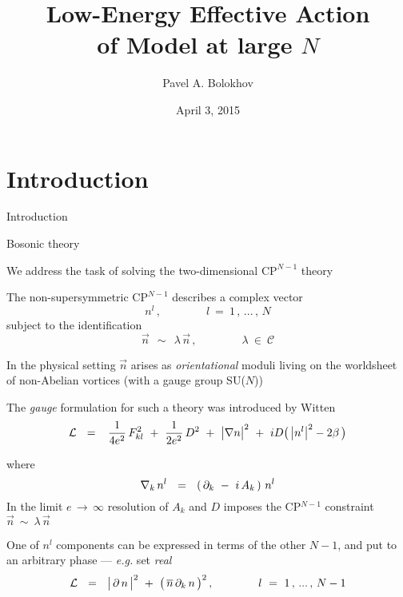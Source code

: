 \documentclass{beamer}
\title[Effective Action of \cp]
      {Low-Energy Effective Action\\
       of \cp Model at large $ N $}
\author{Pavel A. Bolokhov}
\date{April 3, 2015}
\institute[SFU \& SPbSU]{FTPI ~~$\cdot$~~ University of Minnesota}
\newcommand{\cp}{$\text{CP}^{N-1}$\,\,}
\begin{document}
\maketitle

\section{Introduction}
\begin{frame}{}
\fontsize{60pt}{60pt}\selectfont
\begin{center}
        Introduction
\end{center}
\end{frame}


\begin{frame}{Bosonic theory}

	We address the task of solving the two-dimensional \cp theory

	The non-supersymmetric \cp describes a complex vector 
\[
	n^l\,,\qquad\qquad l ~=~ 1\,,\, ...\,,\, N
\]
	subject to the identification
\[
	\vec{n} ~~\sim~~ \lambda\, \vec{n}\,,
	\qquad\qquad \lambda ~\in~ \mathcal{C}
\]

	In the physical setting $ \vec{n} $ arises as {\it orientational} moduli 
	living on the worldsheet of non-Abelian vortices (with a gauge group SU($ N $))

\end{frame}


\begin{frame}{}

	The {\it gauge} formulation for such a theory was introduced by Witten
\[
 	\mathcal{L} ~~=~~
		\,\frac{1}{4e^2}\,F_{kl}^2  ~+~  \frac{1}{2e^2}\, D^2  ~+~
		\big| \nabla n \big|^2  ~+~  iD \big(\, \big|n^l \big|^2 - 2\beta \,\big)
\]

	where 
\[
	\nabla_k\, n^l  ~~=~~  \left(\, \partial_k ~-~ i\,A_k \,\right)\, n^l
\]
	In the limit $ e \,\to\, \infty $ resolution of $ A_k $ and $ D $ imposes
	the CP$^{N-1}$ constraint $ \vec{n} ~\sim~ \lambda\, \vec{n} $

	One of $ n^l $ components can be expressed in terms of the other $ N - 1 $,
	and put to an arbitrary phase --- {\it e.g.} set {\it real}
\[
	\mathcal{L}  ~~=~~  \big|\, \partial\, n \,\big|^2  ~+~  \big(\, \overline{n}\, \partial_k \, n \,\big)^2\,,
	\qquad\qquad l ~=~ 1\,,\, ...\,,\, N-1
\]

\end{frame}
\end{document}
